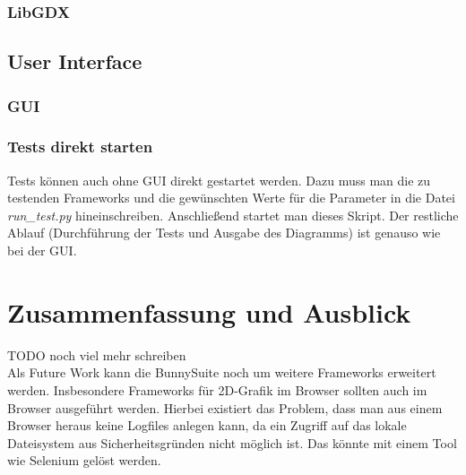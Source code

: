\subsection{LibGDX}

\section{User Interface}
\subsection{GUI}
\subsection{Tests direkt starten}
Tests können auch ohne GUI direkt gestartet werden. Dazu muss man die zu testenden Frameworks und die gewünschten Werte für die Parameter in die Datei \textit{run\_test.py} hineinschreiben. Anschließend startet man dieses Skript. Der restliche Ablauf (Durchführung der Tests und Ausgabe des Diagramms) ist genauso wie bei der GUI.

\chapter{Zusammenfassung und Ausblick}
TODO noch viel mehr schreiben
\\
Als Future Work kann die BunnySuite noch um weitere Frameworks erweitert werden. Insbesondere Frameworks für 2D-Grafik im Browser sollten auch im Browser ausgeführt werden. Hierbei existiert das Problem, dass man aus einem Browser heraus keine Logfiles anlegen kann, da ein Zugriff auf das lokale Dateisystem aus Sicherheitsgründen nicht möglich ist. Das könnte mit einem Tool wie Selenium gelöst werden.
